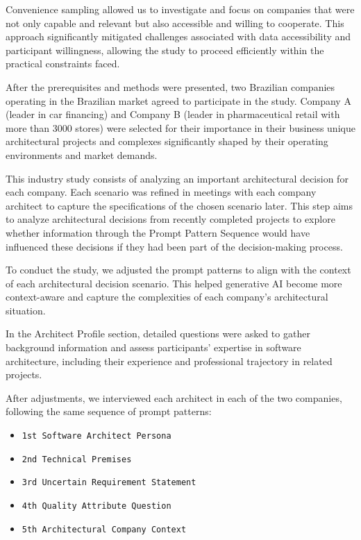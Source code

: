 Convenience sampling allowed us to investigate and focus on companies that were not only capable and relevant but also accessible and willing to cooperate. This approach significantly mitigated challenges associated with data accessibility and participant willingness, allowing the study to proceed efficiently within the practical constraints faced.

After the prerequisites and methods were presented, two Brazilian companies operating in the Brazilian market agreed to participate in the study. Company A (leader in car financing) and Company B (leader in pharmaceutical retail with more than 3000 stores) were selected for their importance in their business unique architectural projects and complexes significantly shaped by their operating environments and market demands.


This industry study consists of analyzing an important architectural decision for each company. Each scenario was refined in meetings with each company architect to capture the specifications of the chosen scenario later. This step aims to analyze architectural decisions from recently completed projects to explore whether information through the Prompt Pattern Sequence would have influenced these decisions if they had been part of the decision-making process.


To conduct the study, we adjusted the prompt patterns to align with the context of each architectural decision scenario. This helped generative AI become more context-aware and capture the complexities of each company's architectural situation. 

In the Architect Profile section, detailed questions were asked to gather background information and assess participants' expertise in software architecture, including their experience and professional trajectory in related projects.


After adjustments, we interviewed each architect in each of the two companies, following the same sequence of prompt patterns:
\begin{itemize}
    \item \texttt{1st Software Architect Persona}
    \item \texttt{2nd Technical Premises}
    \item \texttt{3rd Uncertain Requirement Statement}
    \item \texttt{4th Quality Attribute Question}
    \item \texttt{5th Architectural Company Context}
\end{itemize}

